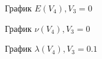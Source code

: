 \documentclass[12pt,a4paper]{article}
\begin{document}
    \begin{figure}[h]
        \caption{График $E(V_4), V_3 = 0$}
    \end{figure}

    \pagebreak

    \begin{figure}[h]
        \caption{График $\nu(V_4), V_3 = 0$}
    \end{figure}

    \begin{figure}[h]
        \caption{График $\lambda(V_4), V_3 = 0.1$}
    \end{figure}
\end{document}
